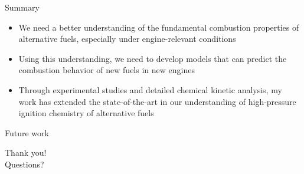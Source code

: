 \documentclass{beamer}
\begin{document}
\begin{frame}{Summary}
    \begin{itemize}
        \item We need a better understanding of the fundamental
            combustion properties of alternative fuels, especially under 
            engine-relevant conditions
        \item Using this understanding, we need to develop models that 
            can predict the combustion behavior of new fuels in new engines
        \item Through experimental studies and detailed chemical kinetic
            analysis, my work has extended the state-of-the-art in our
            understanding of high-pressure ignition chemistry of alternative
            fuels
    \end{itemize}
\end{frame}

\begin{frame}{Future work}
\end{frame}

\begin{frame}
    Thank you!\\
    Questions?
\end{frame}
\end{document}
